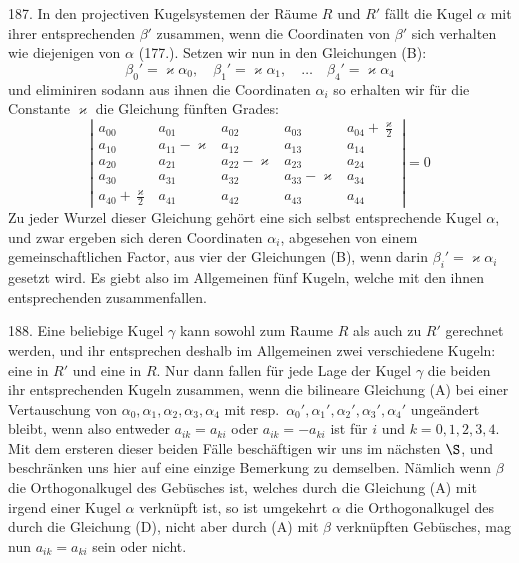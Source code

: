 187. In den projectiven Kugelsystemen der R\"aume $R$
und $R'$ f\"allt die Kugel $\alpha$ mit ihrer entsprechenden $\beta'$ zusammen,
wenn die Coordinaten von $\beta'$ sich verhalten wie diejenigen
von $\alpha$ (177.). Setzen wir nun in den Gleichungen (B):
\[
\beta_0' = \varkappa\alpha_0, \quad
\beta_1' = \varkappa\alpha_1, \quad \ldots \quad
\beta_4' = \varkappa\alpha_4
\]
und eliminiren sodann aus ihnen die Coordinaten $\alpha_i$ so erhalten
wir f\"ur die Constante $\varkappa$ die Gleichung f\"unften Grades:
\[
\left|\begin{array}{lllll}
a_{00} & a_{01} & a_{02} & a_{03} & a_{04}+\frac{\varkappa}{2} \\
a_{10} & a_{11}-\varkappa & a_{12} & a_{13} & a_{14} \\
a_{20} & a_{21} & a_{22}-\varkappa & a_{23} & a_{24} \\
a_{30} & a_{31} & a_{32} & a_{33}-\varkappa & a_{34} \\
a_{40}+\frac{\varkappa}{2} & a_{41} & a_{42} & a_{43} & a_{44}
\end{array}\right|
=0
\]
Zu jeder Wurzel dieser Gleichung geh\"ort eine sich selbst
entsprechende Kugel $\alpha$, und zwar ergeben sich deren Coordinaten
$\alpha_i$, abgesehen von einem gemeinschaftlichen Factor,
aus vier der Gleichungen (B), wenn darin $\beta_i'=\varkappa\alpha_i$ gesetzt
wird. Es giebt also im Allgemeinen f\"unf Kugeln, welche
mit den ihnen entsprechenden zusammenfallen.


188. Eine beliebige Kugel $\gamma$ kann sowohl zum Raume $R$
als auch zu $R'$ gerechnet werden, und ihr entsprechen deshalb
im Allgemeinen zwei verschiedene Kugeln: eine in $R'$
und eine in $R$. Nur dann fallen f\"ur jede Lage der Kugel $\gamma$
die beiden ihr entsprechenden Kugeln zusammen, wenn die
bilineare Gleichung (A) bei einer Vertauschung von $\alpha_0, \alpha_1,
\alpha_2, \alpha_3, \alpha_4$ mit resp.\ $\alpha_0', \alpha_1', \alpha_2', \alpha_3', \alpha_4'$ unge\"andert bleibt, wenn
also entweder $a_{ik}=a_{ki}$ oder $a_{ik}=-a_{ki}$ ist f\"ur $i$ und $k =
0, 1, 2, 3, 4$. Mit dem ersteren dieser beiden F\"alle besch\"aftigen
wir uns im n\"achsten $\S$, und beschr\"anken uns hier auf eine
einzige Bemerkung zu demselben. N\"amlich wenn $\beta$ die Orthogonalkugel
des Geb\"usches ist, welches durch die Gleichung (A)
mit irgend einer Kugel $\alpha$ verkn\"upft ist, so ist umgekehrt $\alpha$
die Orthogonalkugel des durch die Gleichung (D), nicht
aber durch (A) mit $\beta$ verkn\"upften Geb\"usches, mag nun
$a_{ik}=a_{ki}$ sein oder nicht.

